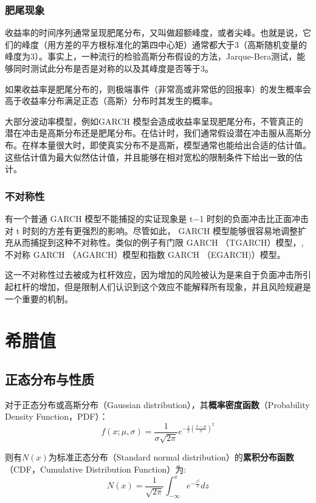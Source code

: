 \documentclass[11pt]{article}
\begin{document}
\subsubsection{肥尾现象}

收益率的时间序列通常呈现肥尾分布，又叫做超额峰度，或者尖峰。也就是说，它们的峰度（用方差的平方根标准化的第四中心矩）通常都大于3（高斯随机变量的峰度为3）。事实上，一种流行的检验高斯分布假设的方法，Jarque-Bera测试，能够同时测试此分布是否是对称的以及其峰度是否等于3。

如果收益率是肥尾分布的，则极端事件（非常高或非常低的回报率）的发生概率会高于收益率分布满足正态（高斯）分布时其发生的概率。

大部分波动率模型，例如GARCH 模型会造成收益率呈现肥尾分布，不管真正的潜在冲击是高斯分布还是肥尾分布。在估计时，我们通常假设潜在冲击服从高斯分布。在样本量很大时，即使真实分布不是高斯，模型通常也能给出合适的估计值。这些估计值为最大似然估计值，并且能够在相对宽松的限制条件下给出一致的估计。

\subsubsection{不对称性}

有一个普通 GARCH 模型不能捕捉的实证现象是 t−1 时刻的负面冲击比正面冲击对 t 时刻的方差有更强烈的影响。尽管如此， GARCH 模型能够很容易地调整扩充从而捕捉到这种不对称性。类似的例子有门限 GARCH （TGARCH）模型，, 不对称 GARCH （AGARCH）模型和指数 GARCH （EGARCH)）模型。

这一不对称性过去被成为杠杆效应，因为增加的风险被认为是来自于负面冲击所引起杠杆的增加，但是限制人们认识到这个效应不能解释所有现象，并且风险规避是一个重要的机制。


\section{希腊值}

\subsection{正态分布与性质}

对于正态分布或高斯分布（Gaussian distribution），其\textbf{概率密度函数}（Probability Density Function，PDF）：
\begin{equation*}
    f(x;\mu,\sigma) = \frac{1}{\sigma\sqrt{2\pi}} e^{-\frac{1}{2}\left(\frac{x-\mu}{\sigma} \right)^2}
\end{equation*}

则有$N(x)$为标准正态分布（Standard normal distribution）的\textbf{累积分布函数}（CDF，Cumulative Distribution Function）为:
\begin{equation*}
    N(x) = \frac{1}{\sqrt{2\pi}} \int_{-\infty}^{x}e^{-\frac{z^2}{2}}dz
\end{equation*}
\end{document}
